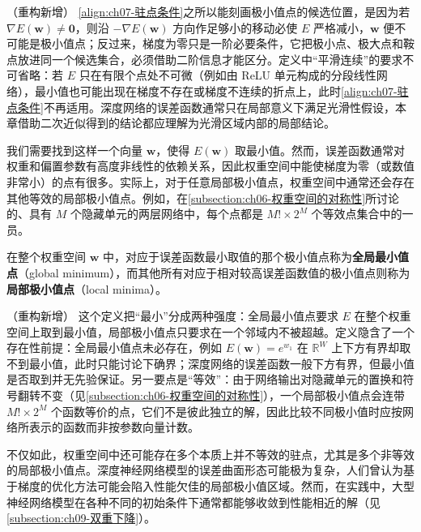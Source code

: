 \documentclass[../../main.tex]{subfiles}
\begin{document}
\begin{remark}（重构新增）
\eqref{align:ch07-驻点条件}之所以能刻画极小值点的候选位置，是因为若 $\nabla E(\mathbf{w})\neq\mathbf{0}$，则沿 $-\nabla E(\mathbf{w})$ 方向作足够小的移动必使 $E$ 严格减小，$\mathbf{w}$ 便不可能是极小值点；反过来，梯度为零只是一阶必要条件，它把极小点、极大点和鞍点放进同一个候选集合，必须借助二阶信息才能区分。定义中“平滑连续”的要求不可省略：若 $E$ 只在有限个点处不可微（例如由 ReLU 单元构成的分段线性网络），最小值也可能出现在梯度不存在或梯度不连续的折点上，此时\eqref{align:ch07-驻点条件}不再适用。深度网络的误差函数通常只在局部意义下满足光滑性假设，本章借助二次近似得到的结论都应理解为光滑区域内部的局部结论。
\end{remark}

我们需要找到这样一个向量 $\mathbf{w}$，使得 $E(\mathbf{w})$ 取最小值。然而，误差函数通常对权重和偏置参数有高度非线性的依赖关系，因此权重空间中能使梯度为零（或数值非常小）的点有很多。实际上，对于任意局部极小值点，权重空间中通常还会存在其他等效的局部极小值点。例如，在\cref{subsection:ch06-权重空间的对称性}所讨论的、具有 $M$ 个隐藏单元的两层网络中，每个点都是 $M!\times 2^{M}$ 个等效点集合中的一员。

\begin{definition}[全局最小值点与局部极小值点]\label{definition:ch07-全局与局部极小}
在整个权重空间 $\mathbf{w}$ 中，对应于误差函数最小取值的那个极小值点称为\textbf{全局最小值点}（global minimum），而其他所有对应于相对较高误差函数值的极小值点则称为\textbf{局部极小值点}（local minima）。
\end{definition}

\begin{remark}（重构新增）
这个定义把“最小”分成两种强度：全局最小值点要求 $E$ 在整个权重空间上取到最小值，局部极小值点只要求在一个邻域内不被超越。定义隐含了一个存在性前提：全局最小值点未必存在，例如 $E(\mathbf{w})=e^{w_1}$ 在 $\mathbb{R}^{W}$ 上下方有界却取不到最小值，此时只能讨论下确界；深度网络的误差函数一般下方有界，但最小值是否取到并无先验保证。另一要点是“等效”：由于网络输出对隐藏单元的置换和符号翻转不变（见\cref{subsection:ch06-权重空间的对称性}），一个局部极小值点会连带 $M!\times 2^{M}$ 个函数等价的点，它们不是彼此独立的解，因此比较不同极小值时应按网络所表示的函数而非按参数向量计数。
\end{remark}

不仅如此，权重空间中还可能存在多个本质上并不等效的驻点，尤其是多个非等效的局部极小值点。深度神经网络模型的误差曲面形态可能极为复杂，人们曾认为基于梯度的优化方法可能会陷入性能欠佳的局部极小值区域。然而，在实践中，大型神经网络模型在各种不同的初始条件下通常都能够收敛到性能相近的解（见\cref{subsection:ch09-双重下降}）。
\end{document}

